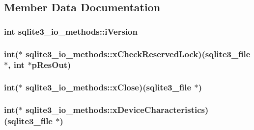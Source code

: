 \subsection{Member Data Documentation}
\hypertarget{structsqlite3__io__methods_ad1c72bdfde750a09a797f314a096a965}{
\subsubsection[{i\-Version}]{\setlength{\rightskip}{0pt plus 5cm}int sqlite3\-\_\-io\-\_\-methods\-::i\-Version}}\label{structsqlite3__io__methods_ad1c72bdfde750a09a797f314a096a965}
\hypertarget{structsqlite3__io__methods_a97f5eb0c2dc7e1cf2f8ecd6857e4c77c}{
\subsubsection[{x\-Check\-Reserved\-Lock}]{\setlength{\rightskip}{0pt plus 5cm}int($\ast$ sqlite3\-\_\-io\-\_\-methods\-::x\-Check\-Reserved\-Lock)({\bf sqlite3\-\_\-file} $\ast$, int $\ast$p\-Res\-Out)}}\label{structsqlite3__io__methods_a97f5eb0c2dc7e1cf2f8ecd6857e4c77c}
\hypertarget{structsqlite3__io__methods_a3c021d16959e0533f507b3212681a22e}{
\subsubsection[{x\-Close}]{\setlength{\rightskip}{0pt plus 5cm}int($\ast$ sqlite3\-\_\-io\-\_\-methods\-::x\-Close)({\bf sqlite3\-\_\-file} $\ast$)}}\label{structsqlite3__io__methods_a3c021d16959e0533f507b3212681a22e}
\hypertarget{structsqlite3__io__methods_ace5e9e9f267c6c57023109c0658f2683}{
\subsubsection[{x\-Device\-Characteristics}]{\setlength{\rightskip}{0pt plus 5cm}int($\ast$ sqlite3\-\_\-io\-\_\-methods\-::x\-Device\-Characteristics)({\bf sqlite3\-\_\-file} $\ast$)}}\label{structsqlite3__io__methods_ace5e9e9f267c6c57023109c0658f2683}
